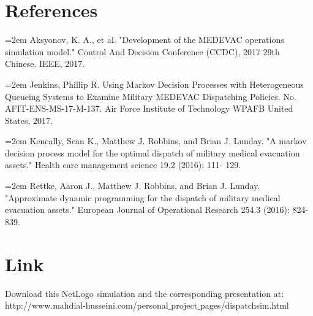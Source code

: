 \documentclass[10pt]{article}
\begin{document}
\section{References}
\noindent
\hangindent=2em
Aksyonov, K. A., et al. "Development of the MEDEVAC operations simulation 	model." Control And Decision Conference (CCDC), 2017 29th Chinese. 	IEEE, 2017.
\par
\noindent
\hangindent=2em
Jenkins, Phillip R. Using Markov Decision Processes with Heterogeneous 	Queueing Systems to Examine Military MEDEVAC Dispatching Policies. No. 	AFIT-ENS-MS-17-M-137. Air Force Institute of Technology WPAFB United 	States, 2017.
\par
\noindent
\hangindent=2em
Keneally, Sean K., Matthew J. Robbins, and Brian J. Lunday. "A markov 	decision process model for the optimal dispatch of military medical 	evacuation assets." Health care management science 19.2 (2016): 111-	129.
\par
\noindent
\hangindent=2em
Rettke, Aaron J., Matthew J. Robbins, and Brian J. Lunday. "Approximate 	dynamic programming for the dispatch of military medical evacuation 	assets." European Journal of Operational Research 254.3 (2016): 824-839.
\section{Link}
Download this NetLogo simulation and the corresponding presentation at:\\
http://www.mahdial-husseini.com/personal$\_$project$\_$pages/dispatchsim.html
\end{document}
